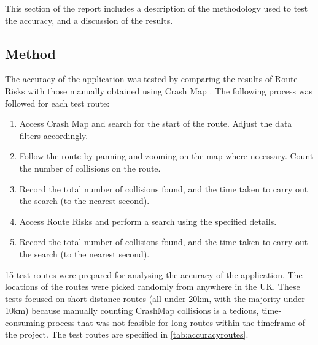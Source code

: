 \documentclass[authoryearcitations]{UoYCSproject}
\begin{document}
This section of the report includes a description of the methodology used to test the accuracy, and a discussion of the results.

\subsection{Method}

The accuracy of the application was tested by comparing the results of Route Risks with those manually obtained using Crash Map \citep{crashmap}. The following process was followed for each test route:

\begin{enumerate}
	\item Access Crash Map and search for the start of the route. Adjust the data filters accordingly.
	\item Follow the route by panning and zooming on the map where necessary. Count the number of collisions on the route.
	\item Record the total number of collisions found, and the time taken to carry out the search (to the nearest second).
	\item Access Route Risks and perform a search using the specified details.
	\item Record the total number of collisions found, and the time taken to carry out the search (to the nearest second).
\end{enumerate}

15 test routes were prepared for analysing the accuracy of the application. The locations of the routes were picked randomly from anywhere in the UK. These tests focused on short distance routes (all under 20km, with the majority under 10km) because manually counting CrashMap collisions is a tedious, time-consuming process that was not feasible for long routes within the timeframe of the project. The test routes are specified in \autoref{tab:accuracyroutes}.
\end{document}
